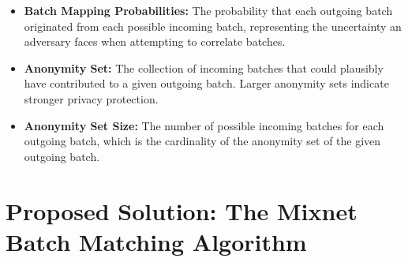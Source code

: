 \documentclass{article}
\begin{document}
\begin{itemize}
\item \textbf{Batch Mapping Probabilities:} The probability 
that each outgoing batch originated 
from each possible incoming 
batch, representing the uncertainty an adversary faces when 
attempting to correlate batches.

\item \textbf{Anonymity Set:} The collection of incoming batches 
that could plausibly have contributed to a given outgoing batch. 
Larger anonymity sets indicate stronger privacy protection.

\item \textbf{Anonymity Set Size:} The number of possible incoming 
batches for each outgoing batch, which is the cardinality of the 
anonymity set of the given outgoing batch.

\end{itemize}

\section{Proposed Solution: The Mixnet Batch Matching Algorithm}
\label{sec:solution}
\end{document}
